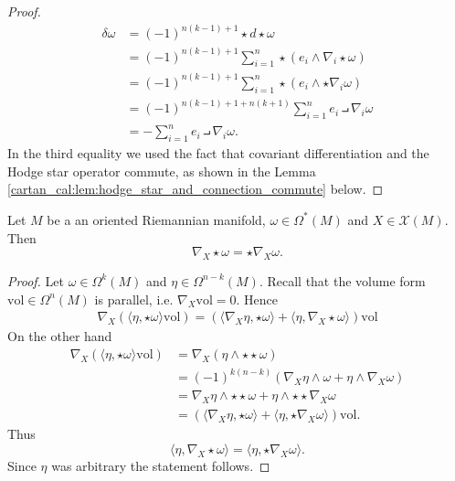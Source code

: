 \begin{proof}
\begin{align*}
        \delta \omega &= (-1)^{n(k-1)+1} \star d \star \omega\\
        &= (-1)^{n(k-1)+1} \sum_{i=1}^n \star (e_i \wedge \nabla_i\star\omega) \\
        &=(-1)^{n(k-1)+1} \sum_{i=1}^n \star (e_i \wedge \star\nabla_i\omega) \\
        &=(-1)^{n(k-1)+1 + n(k+1)} \sum_{i=1}^{n} e_i \intprod \nabla_i\omega \\
        &= -\sum_{i=1}^{n} e_i \intprod \nabla_i\omega.
    \end{align*}
    In the third equality we used the fact that covariant differentiation and the Hodge star operator commute, as shown in the Lemma \ref{cartan_cal:lem:hodge_star_and_connection_commute} below.
\end{proof}


\begin{lemma}
    \label{cartan_cal:lem:hodge_star_and_connection_commute}
    Let $M$ be a an oriented Riemannian manifold, $\omega \in \Omega^\ast(M)$ and $X \in \mathscr{X}(M)$. Then 
    \[
    \nabla_X\star\omega=\star\nabla_X\omega.
    \]
\end{lemma}
\begin{proof}
    Let $\omega \in \Omega^k(M)$ and $\eta \in \Omega^{n-k}(M)$. Recall that the volume form $\mathrm{vol} \in \Omega^n(M)$ is parallel, i.e. $\nabla_X\mathrm{vol} = 0$. Hence 
    \begin{align*}
        \nabla_X(\langle\eta,\star\omega\rangle\mathrm{vol}) = (\langle\nabla_X\eta,\star\omega\rangle + \langle\eta,\nabla_X\star\omega\rangle)\mathrm{vol}
    \end{align*}
    On the other hand 
    \begin{align*}
        \nabla_X(\langle\eta,\star\omega\rangle\mathrm{vol}) &= \nabla_X(\eta \wedge \star\star\omega) \\
        &= (-1)^{k(n-k)}(\nabla_X\eta \wedge \omega + \eta \wedge \nabla_X\omega) \\
        &=\nabla_X\eta \wedge \star\star\omega + \eta \wedge \star\star\nabla_X\omega \\
        &= (\langle\nabla_X\eta,\star\omega\rangle + \langle\eta,\star\nabla_X\omega\rangle)\mathrm{vol}.
    \end{align*}
    Thus 
    \[
    \langle\eta,\nabla_X\star\omega\rangle = \langle\eta,\star\nabla_X\omega\rangle.
    \]
    Since $\eta$ was arbitrary the statement follows.
\end{proof}

